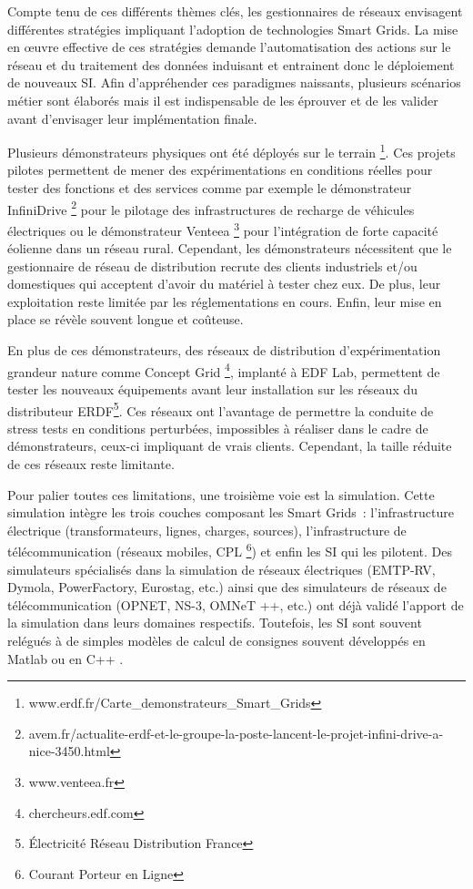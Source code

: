 Compte tenu de ces différents thèmes clés, les gestionnaires de réseaux envisagent différentes stratégies impliquant l'adoption de technologies Smart Grids. 
La mise en œuvre effective de ces stratégies demande l'automatisation des 
actions sur le réseau et du traitement des données induisant et entrainent donc le 
déploiement de nouveaux SI. Afin d'appréhender ces paradigmes naissants, plusieurs scénarios métier sont élaborés mais il est indispensable de les éprouver et de les
valider avant d'envisager leur implémentation finale.

Plusieurs démonstrateurs physiques ont été déployés sur le terrain 
\footnote{www.erdf.fr/Carte\_demonstrateurs\_Smart\_Grids}. Ces projets pilotes 
permettent de mener des expérimentations en conditions réelles pour tester des 
fonctions et des services comme par exemple le démonstrateur InfiniDrive 
\footnote{avem.fr/actualite-erdf-et-le-groupe-la-poste-lancent-le-projet-infini-drive-a-nice-3450.html} 
pour le pilotage des infrastructures de recharge de véhicules électriques ou le 
démonstrateur Venteea \footnote{www.venteea.fr} pour l'intégration de forte 
capacité éolienne dans un réseau rural. Cependant, les démonstrateurs 
nécessitent que le gestionnaire de réseau de distribution recrute des clients 
industriels et/ou domestiques qui acceptent d'avoir du matériel à tester chez 
eux. De plus, leur exploitation reste limitée par les réglementations en cours. 
Enfin, leur mise en place se révèle souvent longue et coûteuse. 

En plus de ces démonstrateurs, des réseaux de distribution d'expérimentation 
grandeur nature comme Concept Grid \footnote{chercheurs.edf.com}, implanté à EDF 
Lab, permettent de tester les nouveaux équipements avant leur installation sur 
les réseaux du distributeur ERDF\footnote{Électricité Réseau Distribution 
France}. Ces réseaux ont l'avantage de permettre la conduite de stress tests en 
conditions perturbées, impossibles à réaliser dans le cadre de démonstrateurs, 
ceux-ci impliquant de vrais clients. Cependant, la taille réduite de ces réseaux 
reste limitante.

Pour palier toutes ces limitations, une troisième voie est la simulation. Cette 
simulation intègre les trois couches composant les Smart Grids~: 
l'infrastructure électrique (transformateurs, lignes, charges, sources), 
l'infrastructure de télécommunication (réseaux mobiles, CPL \footnote{Courant 
Porteur en Ligne}) et enfin les SI qui les pilotent. Des simulateurs spécialisés 
dans la simulation de réseaux électriques (EMTP-RV, Dymola, PowerFactory, 
Eurostag, etc.) ainsi que des simulateurs de réseaux de télécommunication 
(OPNET, NS-3, OMNeT ++, etc.) ont déjà validé l'apport de la simulation dans 
leurs domaines respectifs. Toutefois, les SI sont souvent relégués à de simples 
modèles de calcul de consignes souvent développés en Matlab ou en C++ 
\cite{palensky2014simulating}. 

